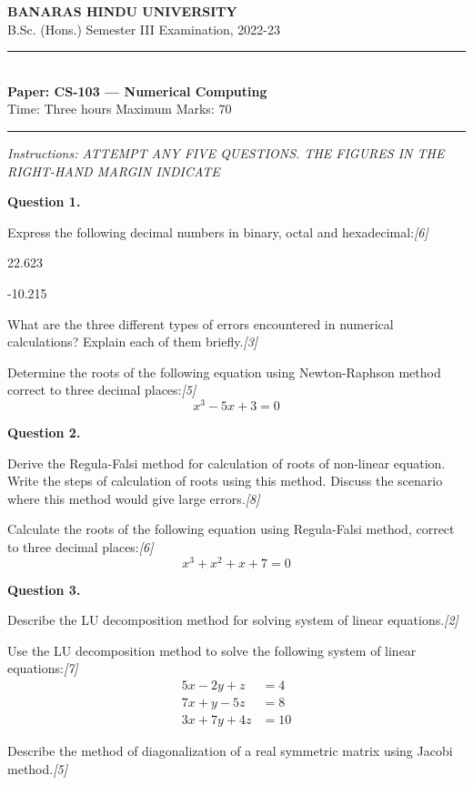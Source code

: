 \documentclass[11pt,a4paper]{article}
\newcommand{\pts}[1]{\hfill\textit{[#1]}}
\begin{document}
\begin{center}
  {\large\bfseries BANARAS HINDU UNIVERSITY}\\[2pt]
  {\normalsize B.Sc. (Hons.) Semester III Examination, 2022-23}\\[6pt]
  \rule{0.8\linewidth}{0.5pt}\\[6pt]
  {\large\bfseries Paper: CS-103 --- Numerical Computing}\\[4pt]
  {\normalsize Time: Three hours \hfill Maximum Marks: 70}
\end{center}

\rule{\linewidth}{0.4pt}

\smallskip
\noindent\textit{Instructions: ATTEMPT ANY FIVE QUESTIONS. THE FIGURES IN THE RIGHT-HAND MARGIN INDICATE}

\bigskip

\medskip\noindent\textbf{Question 1.}
\begin{parts}
  \item Express the following decimal numbers in binary, octal and hexadecimal:\pts{6}
  \begin{parts}
    \item 22.623
    \item -10.215
  \end{parts}
  \item What are the three different types of errors encountered in numerical calculations? Explain each of them briefly.\pts{3}
  \item Determine the roots of the following equation using Newton-Raphson method correct to three decimal places:\pts{5}
  \[ x^3 - 5x + 3 = 0 \]
\end{parts}

\medskip\noindent\textbf{Question 2.}
\begin{parts}
  \item Derive the Regula-Falsi method for calculation of roots of non-linear equation. Write the steps of calculation of roots using this method. Discuss the scenario where this method would give large errors.\pts{8}
  \item Calculate the roots of the following equation using Regula-Falsi method, correct to three decimal places:\pts{6}
  \[ x^3 + x^2 + x + 7 = 0 \]
\end{parts}

\medskip\noindent\textbf{Question 3.}
\begin{parts}
  \item Describe the LU decomposition method for solving system of linear equations.\pts{2}
  \item Use the LU decomposition method to solve the following system of linear equations:\pts{7}
  \[
  \begin{aligned}
    5x - 2y + z &= 4 \\
    7x + y - 5z &= 8 \\
    3x + 7y + 4z &= 10
  \end{aligned}
  \]
  \item Describe the method of diagonalization of a real symmetric matrix using Jacobi method.\pts{5}
\end{parts}
\end{document}
